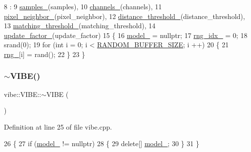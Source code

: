 \begin{DoxyCode}
8                                                                                                            
                     :
9     \mbox{\hyperlink{classvibe_1_1_v_i_b_e_ab27dfab66880b3b9fe8ceeafde283f4c}{samples\_}}(samples),
10     \mbox{\hyperlink{classvibe_1_1_v_i_b_e_a141be141bc39ddd6b9dd04df62b5e3b9}{channels\_}}(channels),
11     \mbox{\hyperlink{classvibe_1_1_v_i_b_e_ace9a8955d2ca2acdcb8efe79a448ce7c}{pixel\_neighbor\_}}(pixel\_neighbor),
12     \mbox{\hyperlink{classvibe_1_1_v_i_b_e_a2e55ef7f6496c14481359d9131135b2b}{distance\_threshold\_}}(distance\_threshold),
13     \mbox{\hyperlink{classvibe_1_1_v_i_b_e_a70dd63f8644e1f36bfd32c58f02593ee}{matching\_threshold\_}}(matching\_threshold),
14     \mbox{\hyperlink{classvibe_1_1_v_i_b_e_a3abaee256b69fec3b0b49805a0e92e0c}{update\_factor\_}}(update\_factor)
15 \{
16     \mbox{\hyperlink{classvibe_1_1_v_i_b_e_af42cd53bbc91e95f14aa6c474bde5601}{model\_}} = \textcolor{keyword}{nullptr};
17     \mbox{\hyperlink{classvibe_1_1_v_i_b_e_a76075aca9f68dffb84163e510b2dd122}{rng\_idx\_}} = 0;
18     srand(0);
19     \textcolor{keywordflow}{for} (\textcolor{keywordtype}{int} i = 0; i < \mbox{\hyperlink{vibe_8hpp_a776fe25c29d34b95d69a1418f75ae80f}{RANDOM\_BUFFER\_SIZE}}; i ++)
20     \{
21         \mbox{\hyperlink{classvibe_1_1_v_i_b_e_abc43782cfa12e3f055fa1212833f8595}{rng\_}}[i] = rand();
22     \}
23 \}
\end{DoxyCode}
\mbox{\label{classvibe_1_1_v_i_b_e_ac74c9e86dff359028892e86ec699a17c}} 
\subsubsection{\texorpdfstring{$\sim$\+V\+I\+B\+E()}{~VIBE()}}
{\footnotesize\ttfamily vibe\+::\+V\+I\+B\+E\+::$\sim$\+V\+I\+BE (\begin{DoxyParamCaption}{ }\end{DoxyParamCaption})}



Definition at line 25 of file vibe.\+cpp.


\begin{DoxyCode}
26 \{
27     \textcolor{keywordflow}{if} (\mbox{\hyperlink{classvibe_1_1_v_i_b_e_af42cd53bbc91e95f14aa6c474bde5601}{model\_}} != \textcolor{keyword}{nullptr})
28     \{
29         \textcolor{keyword}{delete}[] \mbox{\hyperlink{classvibe_1_1_v_i_b_e_af42cd53bbc91e95f14aa6c474bde5601}{model\_}};
30     \}
31 \}
\end{DoxyCode}


